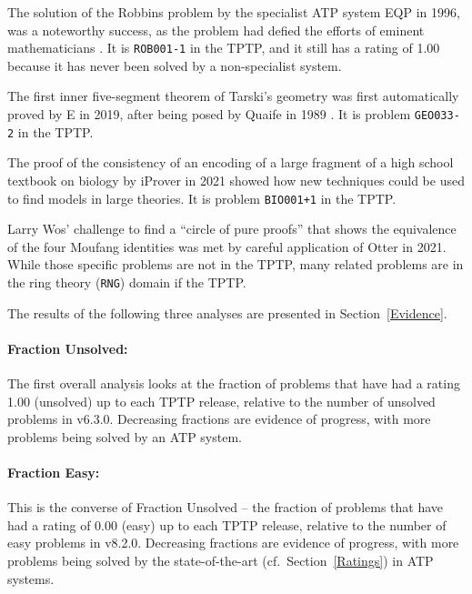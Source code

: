 \documentclass[runningheads]{llncs}
\newenvironment{packed_itemize}{
\vspace*{-0.5em}
\begin{itemize}
\setlength{\partopsep}{0pt}
\setlength{\itemsep}{1pt}
\setlength{\parskip}{0pt}
\setlength{\parsep}{0pt}
}{\end{itemize}}
\begin{document}
\begin{packed_itemize}
\item The solution of the Robbins problem \cite{} by the specialist ATP system EQP \cite{McC97} 
      in 1996, was a noteworthy success, as the problem had defied the efforts of eminent 
      mathematicians \cite{HMT71}.
      It is {\tt ROB001-1} in the TPTP, and it still has a rating of 1.00 because it has never 
      been solved by a non-specialist system.
\item The first inner five-segment theorem of Tarski's geometry \cite{SST83} was first 
      automatically proved by E \cite{Sch13-LPAR} in 2019, after being posed by Quaife in 
      1989 \cite{Qua89}.
      It is problem {\tt GEO033-2} in the TPTP.
\item The proof of the consistency of an encoding of a large fragment of a high school textbook
      on biology \cite{CDI13} by iProver \cite{Kor08} in 2021 showed how new techniques could
      be used to find models in large theories.
      It is problem {\tt BIO001+1} in the TPTP.
\item Larry Wos' challenge to find a ``circle of pure proofs'' that shows the equivalence
      of the four Moufang identities \cite{Wos19} was met by careful application \cite{Ver22} of
      Otter \cite{McC03-Otter} in 2021.
      While those specific problems are not in the TPTP, many related problems are in the
      ring theory ({\tt RNG}) domain if the TPTP.
\end{packed_itemize}

\vspace*{1em}
\noindent
The results of the following three analyses are presented in Section~\ref{Evidence}.

\paragraph{Fraction Unsolved:}
The first overall analysis looks at the fraction of problems that have had a rating 1.00 
(unsolved) up to each TPTP release, relative to the number of unsolved problems in v6.3.0.
Decreasing fractions are evidence of progress, with more problems being solved by an ATP system.

\paragraph{Fraction Easy:}
This is the converse of Fraction Unsolved -- the fraction of problems that have had a rating of 
0.00 (easy) up to each TPTP release, relative to the number of easy problems in v8.2.0.
Decreasing fractions are evidence of progress, with more problems being solved by the 
state-of-the-art (cf.~Section~\ref{Ratings}) in ATP systems.
\end{document}
